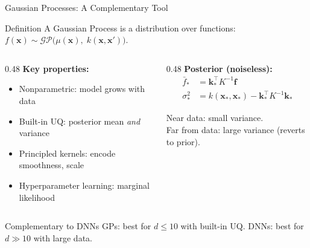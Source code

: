\documentclass[aspectratio=169,11pt]{beamer}
\newcommand{\emphc}[1]{\textcolor{harvardcrimson}{#1}}
\newcommand{\x}{\bm{x}}
\begin{document}
\begin{frame}{Gaussian Processes: A Complementary Tool}
\begin{block}{Definition}
A \emphc{Gaussian Process} is a distribution over functions:
$f(\x) \sim \mathcal{GP}\bigl(\mu(\x),\; k(\x, \x')\bigr).$
\end{block}

\vspace{0.2em}
\begin{columns}[T]
\begin{column}{0.48\textwidth}
\textbf{Key properties:}
\begin{itemize}\itemsep1pt
  \item \emphc{Nonparametric:} model grows with data
  \item \emphc{Built-in UQ:} posterior mean \emph{and} variance
  \item \emphc{Principled kernels:} encode smoothness, scale
  \item \emphc{Hyperparameter learning:} marginal likelihood
\end{itemize}
\end{column}
\begin{column}{0.48\textwidth}
\textbf{Posterior (noiseless):}
\begin{align*}
\bar{f}_* &= \bm{k}_*^\top K^{-1} \bm{f} \\
\sigma_*^2 &= k(\x_*, \x_*) - \bm{k}_*^\top K^{-1} \bm{k}_*
\end{align*}
\vspace{-0.3cm}

{\small Near data: \emphc{small variance}.\\
Far from data: \emphc{large variance} (reverts to prior).}
\end{column}
\end{columns}

\vspace{0.3em}
\begin{alertblock}{Complementary to DNNs}
GPs: best for $d \leq 10$ with built-in UQ. \quad DNNs: best for $d \gg 10$ with large data.
\end{alertblock}
\end{frame}
\end{document}
